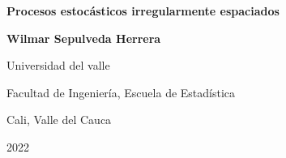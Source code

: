 \thispagestyle{empty}

\begin{center}
\begin{figure}
\centering
{}
\end{figure}\vspace*{2.0cm}

\textbf{\huge Procesos estocásticos irregularmente espaciados}\vspace*{4.0cm}

\Large\textbf{Wilmar Sepulveda Herrera}\vspace*{4.0cm}

\small Universidad del valle

Facultad de Ingeniería, Escuela de Estadística

Cali, Valle del Cauca

2022
\end{center}

\newpage{\pagestyle{empty}\cleardoublepage}

\newpage

\thispagestyle{empty}

